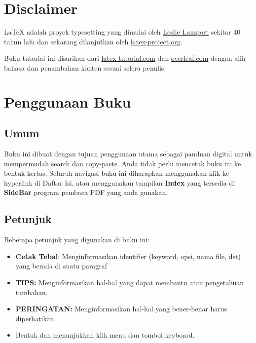 \documentclass{book} %
\begin{document}
    \newpage
    \chapter{Disclaimer} %

    \LaTeX{} adalah proyek typesetting yang dimulai oleh \href{https://en.wikipedia.org/wiki/Leslie_Lamport}{Leslie Lamport}
    sekitar 40 tahun lalu dan sekarang dilanjutkan oleh \href{https://www.latex-project.org/}{latex-project.org}.

    \bigskip %

    Buku tutorial ini disarikan dari \href{https://latex-tutorial.com/tutorials}{latex-tutorial.com}
    dan \href{https://www.overleaf.com/learn/latex/Tutorials}{overleaf.com} dengan alih bahasa dan penambahan konten sesuai selera penulis.


	\newpage
	\chapter{Penggunaan Buku}

	\section{Umum} %
	Buku ini dibuat dengan tujuan penggunaan utama sebagai panduan digital untuk mempermudah search dan copy-paste.
	Anda tidak perlu mencetak buku ini ke bentuk kertas.
	Seluruh navigasi buku ini diharapkan menggunakan klik ke hyperlink di Daftar Isi,
	atau menggunakan tampilan \textbf{Index} yang tersedia di \textbf{SideBar} program pembaca PDF yang anda gunakan.

	\section{Petunjuk}
	Beberapa petunjuk yang digunakan di buku ini:
	\begin{itemize} %
		\item \textbf{Cetak Tebal}: Menginformasikan identifier (keyword, opsi, nama file, dst) yang berada di suatu paragraf
		\item \textbf{TIPS:} Menginformasikan hal-hal yang dapat membantu atau pengetahuan tambahan.
		\item \textbf{PERINGATAN:} Menginformasikan hal-hal yang bener-benar harus diperhatikan.
		\item Bentuk  dan  menunjukkan klik menu dan tombol keyboard.
	\end{itemize}
\end{document}
